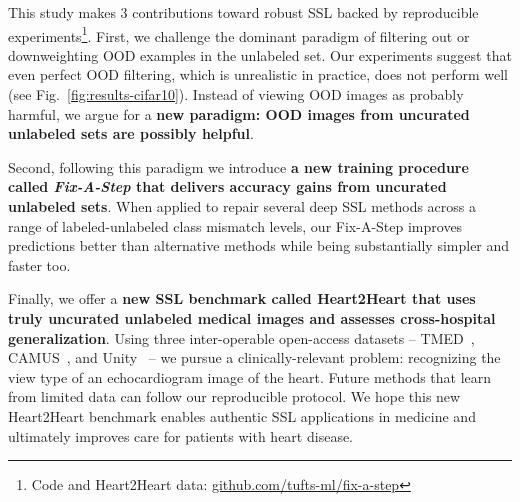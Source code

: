 
This study makes 3 contributions toward robust SSL backed by reproducible experiments\footnote{Code and Heart2Heart data: \href{https://github.com/tufts-ml/fix-a-step}{github.com/tufts-ml/fix-a-step}}.
First, we challenge the dominant paradigm of filtering out or downweighting OOD examples in the unlabeled set.
Our experiments suggest that even perfect OOD filtering, which is unrealistic in practice, does not perform well (see Fig.~\ref{fig:results-cifar10}).
Instead of viewing OOD images as probably harmful, we argue for a \textbf{new paradigm: OOD images from uncurated unlabeled sets are possibly helpful}.

Second, following this paradigm we introduce \textbf{a new training procedure called \emph{Fix-A-Step} that delivers accuracy gains from uncurated unlabeled sets}.
When applied to repair several deep SSL methods across a range of labeled-unlabeled class mismatch levels, our Fix-A-Step improves predictions better than alternative methods while being substantially simpler and faster too.

Finally, we offer a \textbf{new SSL benchmark called Heart2Heart that uses truly uncurated unlabeled medical images and assesses cross-hospital generalization}.
Using three inter-operable open-access datasets -- TMED~\citep{huangNewSemisupervisedLearning2021}, CAMUS~\citep{leclercDeepLearningSegmentation2019}, and Unity~\citep{howardAutomatedLeftVentricular2021} --
we pursue a clinically-relevant problem: recognizing the view type of an echocardiogram image of the heart.
Future methods that learn from limited data can follow our reproducible protocol. 
We hope this new Heart2Heart benchmark enables authentic SSL applications in medicine and ultimately improves care for patients with heart disease.

